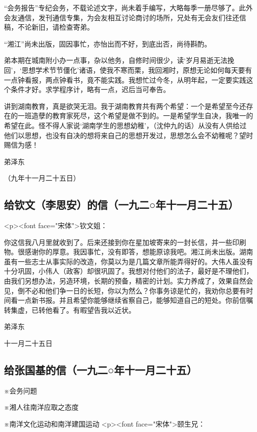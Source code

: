 “会务报告”专纪会务，不载论述文字，尚未着手编写，大略每季一册尽够了。此外会友通信，发刊通信专集，为会友相互讨论商讨的场所，兄处有无会友们往还信稿，不论新旧，请检查寄弟。

“湘江”尚未出版，固因事忙，亦怡出而不好，到底出否，尚待斟酌。

弟本期在城南附小办一点事，杂以他务，自修时间很少，读‘岁月易逝无法挽回’，‘思想学术节节僵化’诸语，使我不寒而栗，我回湘时，原想无论如何每天要有一点钟看报，两点钟看书，竟不能实践。我想忙过今冬，从明年起，一定要实践这个条件才好。求学程序计，略有一点，迟后当可奉告。

讲到湖南教育，真是欲哭无泪。我于湖南教育共有两个希望：一个是希望至今还存在的一班造孽的教育家死尽，这个希望是做不到的。一是希望学生自决，我唯一的希望在此。怪不得人家说‘湖南学生的思想幼稚’，（沈仲九的话）从没有人供给过他们以思想，也没有自决的想将来自己的思想开发过，思想怎么会不幼稚呢？望时赐信为感！

 弟泽东

 （九年十一月二十五日）
\subsection{给钦文（李思安）的信（一九二○年十一月二十五）}
<p><font face="宋体">钦文姐：

你这信我八月里就收到了。后来还接到你在星加坡寄来的一封长信，并一些印刷物。很感谢你的厚意。我因事忙，没有即答，想能原谅我吧。湘江尚未出版。湖南虽有一些志士从事实际的改造，你莫以为是几篇文章所能弄得好的。大伟人虽没有十分巩固，小伟人（政客）却很巩固了。我想对付他们的法子，最好是不理他们，由我们另想办法，另造环境，长期的预备，精密的计划。实力养成了，效果自然会见，倒不必和他们争一日的长短，你以为然么？你事务谅是忙的，我劝你总要有时间看一点新书报。并且希望你能够继续省察自己，能够知道自己的短处。你前信嘱转集虚，已转他看了。有暇望告我以近状。

 弟泽东

 十一月二十五日
\subsection{给张国基的信（一九二○年十一月二十五）}

※会务问题

※湘人往南洋应取之态度

※南洋文化运动和南洋建国运动
<p><font face="宋体">颐生兄：

